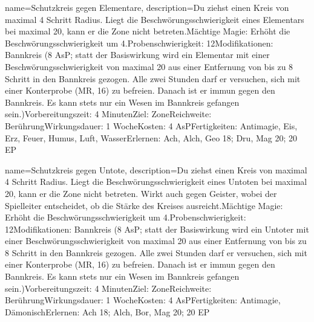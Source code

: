 {
    name={Schutzkreis gegen Elementare},
    description={Du ziehst einen Kreis von maximal 4 Schritt Radius. Liegt die Beschwörungsschwierigkeit eines Elementars bei maximal 20, kann er die Zone nicht betreten.\newline Mächtige Magie: Erhöht die Beschwörungsschwierigkeit um 4.\newline Probenschwierigkeit: 12\newline Modifikationen: Bannkreis (8 AsP; statt der Basiswirkung wird ein Elementar mit einer Beschwörungsschwierigkeit von maximal 20 aus einer Entfernung von bis zu 8 Schritt in den Bannkreis gezogen. Alle zwei Stunden darf er versuchen, sich mit einer Konterprobe (MR, 16) zu befreien. Danach ist er immun gegen den Bannkreis. Es kann stets nur ein Wesen im Bannkreis gefangen sein.)\newline Vorbereitungszeit: 4 Minuten\newline Ziel: Zone\newline Reichweite: Berührung\newline Wirkungsdauer: 1 Woche\newline Kosten: 4 AsP\newline Fertigkeiten: Antimagie, Eis, Erz, Feuer, Humus, Luft, Wasser\newline Erlernen: Ach, Alch, Geo 18; Dru, Mag 20; 20 EP}
}


{
    name={Schutzkreis gegen Untote},
    description={Du ziehst einen Kreis von maximal 4 Schritt Radius. Liegt die Beschwörungsschwierigkeit eines Untoten bei maximal 20, kann er die Zone nicht betreten. Wirkt auch gegen Geister, wobei der Spielleiter entscheidet, ob die Stärke des Kreises ausreicht.\newline Mächtige Magie: Erhöht die Beschwörungsschwierigkeit um 4.\newline Probenschwierigkeit: 12\newline Modifikationen: Bannkreis (8 AsP; statt der Basiswirkung wird ein Untoter mit einer Beschwörungsschwierigkeit von maximal 20 aus einer Entfernung von bis zu 8 Schritt in den Bannkreis gezogen. Alle zwei Stunden darf er versuchen, sich mit einer Konterprobe (MR, 16) zu befreien. Danach ist er immun gegen den Bannkreis. Es kann stets nur ein Wesen im Bannkreis gefangen sein.)\newline Vorbereitungszeit: 4 Minuten\newline Ziel: Zone\newline Reichweite: Berührung\newline Wirkungsdauer: 1 Woche\newline Kosten: 4 AsP\newline Fertigkeiten: Antimagie, Dämonisch\newline Erlernen: Ach 18; Alch, Bor, Mag 20; 20 EP}
}


